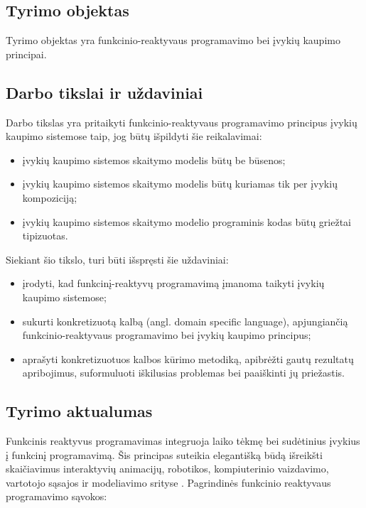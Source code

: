 \subsection{Tyrimo objektas}

    Tyrimo objektas yra funkcinio-reaktyvaus programavimo bei įvykių kaupimo principai.

\subsection{Darbo tikslai ir uždaviniai}

    Darbo tikslas yra pritaikyti funkcinio-reaktyvaus programavimo principus įvykių kaupimo sistemose taip, jog būtų išpildyti šie reikalavimai:

\begin{itemize}

    \item įvykių kaupimo sistemos skaitymo modelis būtų be būsenos;

    \item įvykių kaupimo sistemos skaitymo modelis būtų kuriamas tik per įvykių kompoziciją;

    \item įvykių kaupimo sistemos skaitymo modelio programinis kodas būtų griežtai tipizuotas.

\end{itemize}

    Siekiant šio tikslo, turi būti išspręsti šie uždaviniai:

\begin{itemize}
        \item įrodyti, kad funkcinį-reaktyvų programavimą įmanoma taikyti įvykių
            kaupimo sistemose;
        \item sukurti konkretizuotą kalbą (angl. domain specific language), apjungiančią funkcinio-reaktyvaus programavimo
            bei įvykių kaupimo principus;
        \item aprašyti konkretizuotuos kalbos kūrimo metodiką, apibrėžti gautų rezultatų apribojimus, suformuluoti iškilusias problemas bei paaiškinti jų priežastis.
\end{itemize}

\subsection{Tyrimo aktualumas}

    Funkcinis reaktyvus programavimas integruoja laiko tėkmę bei sudėtinius įvykius į funkcinį programavimą. Šis principas suteikia elegantišką būdą išreikšti skaičiavimus interaktyvių animacijų, robotikos, kompiuterinio vaizdavimo, vartotojo sąsajos ir modeliavimo srityse \cite[p. 4]{ELM:FRP}. Pagrindinės funkcinio reaktyvaus programavimo sąvokos:


